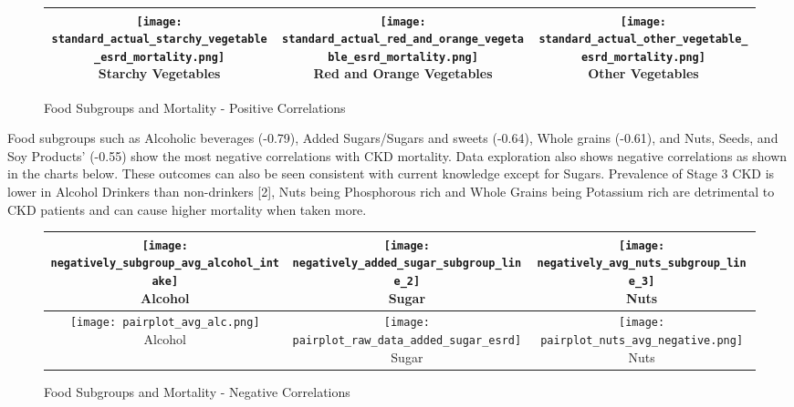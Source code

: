\begin{center}
\begin{figure}
\centering
\caption{Food Subgroups and Mortality - Positive Correlations}
\vspace{0.25cm}
\small
\begin{tabular}{|c|c|c|}
        \hline	
	\specialcell{\texttt{[image: standard\_actual\_starchy\_vegetable\_esrd\_mortality.png]} \\ Starchy Vegetables} & 
	\specialcell{\texttt{[image: standard\_actual\_red\_and\_orange\_vegetable\_esrd\_mortality.png]} \\ Red and Orange Vegetables} & 
	 \specialcell{\texttt{[image: standard\_actual\_other\_vegetable\_esrd\_mortality.png]}	 \\ Other Vegetables} \\
	 \hline
\end{tabular}
\end{figure}
\end{center}

\noindent  Food subgroups such as Alcoholic beverages (-0.79),    Added Sugars/Sugars and sweets (-0.64), Whole grains (-0.61), and  Nuts, Seeds, and Soy Products’ (-0.55) show the most negative correlations with CKD mortality. Data exploration also shows negative correlations as shown in the charts below. These outcomes can also be seen consistent with current knowledge except for Sugars. Prevalence of Stage 3 CKD is lower in Alcohol Drinkers than non-drinkers [2], Nuts being Phosphorous rich and Whole Grains being Potassium rich are detrimental to CKD patients and can cause higher mortality when taken more.

\begin{center}
\begin{figure}
\centering
\caption{Food Subgroups and Mortality - Negative Correlations}
\vspace{0.25cm}
\small
\begin{tabular}{|c|c|c|}
\hline	
	\specialcell{ \texttt{[image: negatively\_subgroup\_avg\_alcohol\_intake]} \\ Alcohol } & 
	\specialcell{\texttt{[image: negatively\_added\_sugar\_subgroup\_line\_2]} \\ Sugar } &
	\specialcell{ \texttt{[image: negatively\_avg\_nuts\_subgroup\_line\_3]} \\ Nuts } \\
	\hline
	\specialcell{ \texttt{[image: pairplot\_avg\_alc.png]} \\ Alcohol} & 
	\specialcell{\texttt{[image: pairplot\_raw\_data\_added\_sugar\_esrd]} \\ Sugar } &
	\specialcell{\texttt{[image: pairplot\_nuts\_avg\_negative.png]} \\ Nuts } \\
	\hline
\end{tabular}
\end{figure}
\end{center}

